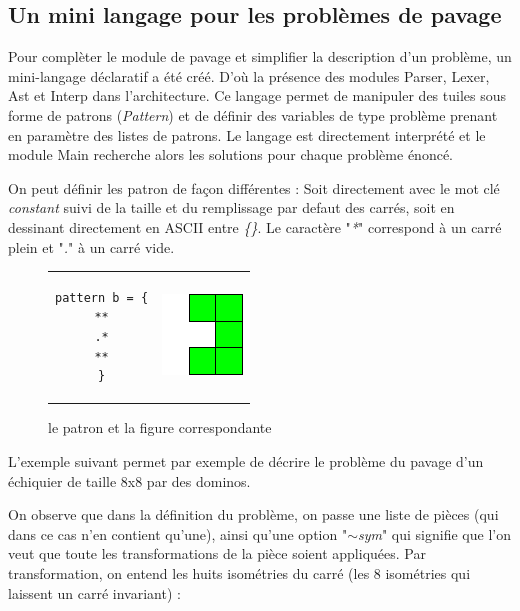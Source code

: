 \documentclass[a4paper]{article}
\begin{document}
\subsection{Un mini langage pour les problèmes de pavage}
Pour complèter le module de pavage et simplifier la description d'un problème, 
un mini-langage déclaratif a été créé. D'où la présence des
modules Parser, Lexer, Ast et Interp dans l'architecture. 
Ce langage permet de manipuler des tuiles sous forme de patrons (\emph{Pattern})
et de définir des variables de type problème prenant en paramètre des listes de 
patrons. Le langage est directement interprété et le module Main recherche 
alors les solutions pour chaque problème énoncé. 

On peut définir les patron de façon différentes : Soit directement avec le mot
clé \emph{constant} suivi de la taille et du remplissage par defaut des carrés,
soit en dessinant directement en ASCII entre 
\emph{\{\}}. Le caractère "\emph{*}" correspond à un carré plein et "\emph{.}" à
un carré vide.

\begin{figure}[h]
\centering
\begin{tabular}{c c}
\begin{lstlisting}
pattern b = {
**
.*
**
}
\end{lstlisting}&
\includegraphics[scale=1]{../imports/patron.pdf}
\end{tabular}
\caption{le patron et la figure correspondante}
\label{fig:myfirsttable}
\end{figure}

L'exemple suivant permet par exemple de décrire le problème du pavage d'un 
échiquier de taille 8x8 par des dominos.



On observe que dans la définition du problème, on passe une liste de pièces (qui
dans ce cas n'en contient qu'une), ainsi qu'une option "\emph{$\sim$sym}" qui 
signifie que l'on veut que toute les transformations de la pièce soient 
appliquées.
Par transformation, on entend les huits isométries du carré (les 8 isométries
qui laissent un carré invariant) : 
\end{document}
